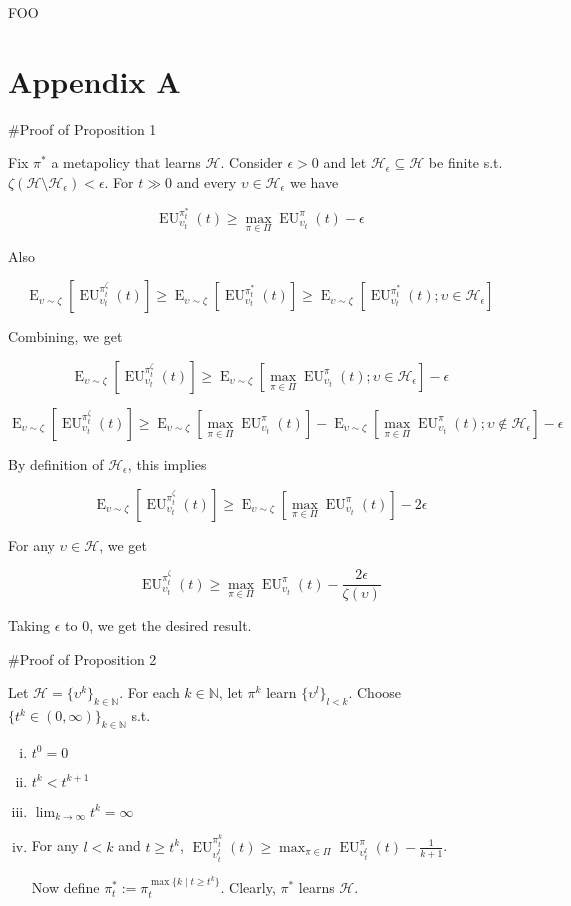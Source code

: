 \documentclass[a4paper]{article}
\DeclareMathOperator{\E}{E}
\newcommand{\Nats}{\mathbb{N}}
\newcommand{\Hy}{\mathcal{H}}
\newcommand{\EU}{\operatorname{EU}}
\begin{document}
FOO

\section{Appendix A}

\#Proof of Proposition 1

Fix $\pi^*$ a metapolicy that learns $\Hy$. Consider $\epsilon > 0$ and let $\Hy_\epsilon \subseteq \Hy$ be finite s.t. $\zeta(\Hy \setminus \Hy_\epsilon) < \epsilon$. For $t \gg 0$ and every $\upsilon \in \Hy_\epsilon$ we have

$$\EU_{\upsilon_t}^{\pi^*_t}(t) \geq \max_{\pi \in \Pi} \EU_{\upsilon_t}^{\pi}(t) - \epsilon$$

Also

$$\E_{\upsilon \sim \zeta}[\EU_{\upsilon_t}^{\pi^\zeta_t}(t)] \geq \E_{\upsilon \sim \zeta}[\EU_{\upsilon_t}^{\pi^*_t}(t)] \geq \E_{\upsilon \sim \zeta}[\EU_{\upsilon_t}^{\pi^*_t}(t); \upsilon \in \Hy_\epsilon]$$

Combining, we get

$$\E_{\upsilon \sim \zeta}[\EU_{\upsilon_t}^{\pi^\zeta_t}(t)] \geq \E_{\upsilon \sim \zeta}[\max_{\pi \in \Pi} \EU_{\upsilon_t}^{\pi}(t); \upsilon \in \Hy_\epsilon] - \epsilon$$

$$\E_{\upsilon \sim \zeta}[\EU_{\upsilon_t}^{\pi^\zeta_t}(t)] \geq \E_{\upsilon \sim \zeta}[\max_{\pi \in \Pi} \EU_{\upsilon_t}^{\pi}(t)] -  \E_{\upsilon \sim \zeta}[\max_{\pi \in \Pi} \EU_{\upsilon_t}^{\pi}(t); \upsilon \not\in \Hy_\epsilon] - \epsilon$$

By definition of $\Hy_\epsilon$, this implies

$$\E_{\upsilon \sim \zeta}[\EU_{\upsilon_t}^{\pi^\zeta_t}(t)] \geq \E_{\upsilon \sim \zeta}[\max_{\pi \in \Pi} \EU_{\upsilon_t}^{\pi}(t)] -  2\epsilon$$

For any $\upsilon \in \Hy$, we get

$$\EU_{\upsilon_t}^{\pi^\zeta_t}(t) \geq \max_{\pi \in \Pi} \EU_{\upsilon_t}^{\pi}(t) - \frac{2\epsilon}{\zeta(\upsilon)}$$

Taking $\epsilon$ to 0, we get the desired result.

\#Proof of Proposition 2

Let $\Hy = \{\upsilon^k\}_{k \in \Nats}$. For each $k \in \Nats$, let $\pi^k$ learn $\{\upsilon^l\}_{l < k}$. Choose $\{t^k \in (0,\infty)\}_{k \in \Nats}$ s.t.

\begin{enumerate}[i.]

\item $t^0 = 0$
\item $t^k < t^{k+1}$
\item $\lim_{k \rightarrow \infty} t^k = \infty$
\item For any $l < k$ and $t \geq t^k$, $\EU_{\upsilon^l_t}^{\pi^k_t}(t) \geq \max_{\pi \in \Pi} \EU_{\upsilon^l_t}^\pi(t) - \frac{1}{k+1}$.

Now define $\pi^*_t:=\pi_t^{\max\{k \mid t \geq t^k\}}$. Clearly, $\pi^*$ learns $\Hy$.

\end{enumerate}
\end{document}
